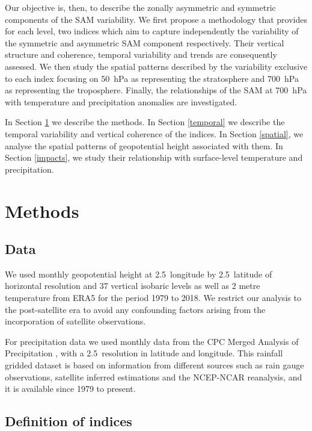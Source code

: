 \documentclass[smallextended]{svjour3}       %
\begin{document}
Our objective is, then, to describe the zonally asymmetric and symmetric components of the SAM variability.
We first propose a methodology that provides for each level, two indices which aim to capture independently the variability of the symmetric and asymmetric SAM component respectively.
Their vertical structure and coherence, temporal variability and trends are consequently assessed.
We then study the spatial patterns described by the variability exclusive to each index focusing on 50~hPa as representing the stratosphere and 700~hPa as representing the troposphere.
Finally, the relationships of the SAM at 700~hPa with temperature and precipitation anomalies are investigated.

In Section \ref{methods} we describe the methods.
In Section \ref{temporal} we describe the temporal variability and vertical coherence of the indices.
In Section \ref{spatial}, we analyse the spatial patterns of geopotential height associated with them.
In Section \ref{impacts}, we study their relationship with surface-level temperature and precipitation.

\hypertarget{methods}{%
\section{Methods}\label{methods}}

\hypertarget{data}{%
\subsection{Data}\label{data}}

We used monthly geopotential height at 2.5\degree~longitude by 2.5\degree~latitude of horizontal resolution and 37 vertical isobaric levels as well as 2 metre temperature from ERA5 \citep{hersbach2020} for the period 1979 to 2018.
We restrict our analysis to the post-satellite era to avoid any confounding factors arising from the incorporation of satellite observations.

For precipitation data we used monthly data from the CPC Merged Analysis of Precipitation \citep{xie1997}, with a 2.5\degree~resolution in latitude and longitude.
This rainfall gridded dataset is based on information from different sources such as rain gauge observations, satellite inferred estimations and the NCEP-NCAR reanalysis, and it is available since 1979 to present.

\hypertarget{definition-of-indices}{%
\subsection{Definition of indices}\label{definition-of-indices}}
\end{document}
